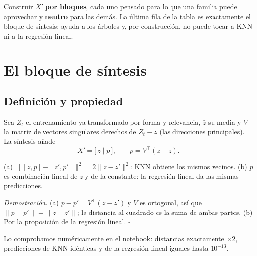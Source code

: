 \documentclass[apuntes]{uc3mmaster}
\begin{document}
\begin{idea}
Construir $X'$ \textbf{por bloques}, cada uno pensado para lo que una familia puede aprovechar y \textbf{neutro} para
las demás. La última fila de la tabla es exactamente el bloque de síntesis: ayuda a los árboles y, por construcción,
no puede tocar a KNN ni a la regresión lineal.
\end{idea}

\section{El bloque de síntesis}\label{sec:sintesis}
\subsection{Definición y propiedad}
Sea $Z_t$ el entrenamiento ya transformado por forma y relevancia, $\bar z$ su media y $V$ la matriz de vectores
singulares derechos de $Z_t-\bar z$ (las direcciones principales). La síntesis añade
\[
X' = \big[\,z \;\big|\; p\,\big],\qquad p = V^\top (z-\bar z).
\]
\begin{proposicion}
(a) $\lVert[z,p]-[z',p']\rVert^2 = 2\lVert z-z'\rVert^2$: KNN obtiene los mismos vecinos. (b) $p$ es combinación
lineal de $z$ y de la constante: la regresión lineal da las mismas predicciones.
\end{proposicion}
\textit{Demostración.} (a) $p-p'=V^\top(z-z')$ y $V$ es ortogonal, así que $\lVert p-p'\rVert=\lVert z-z'\rVert$; la
distancia al cuadrado es la suma de ambas partes. (b) Por la proposición de la regresión lineal. $\square$

Lo comprobamos numéricamente en el notebook: distancias exactamente $\times2$, predicciones de KNN idénticas y de la
regresión lineal iguales hasta $10^{-13}$.
\end{document}
